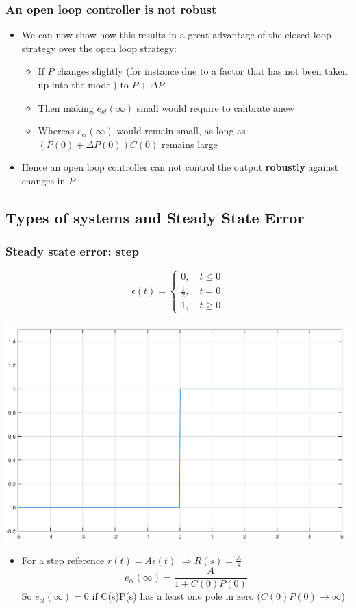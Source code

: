 \begin{frame}
	\frametitle{An open loop controller is not robust}
	\begin{itemize}
		\item We can now show how this results in a great advantage of the closed loop strategy over the open loop strategy:
		\begin{itemize}
			\item If $P$ changes slightly (for instance due to a factor that has not been taken up into the model) to $P+\Delta P$
			\item Then making $e_{ol}(\infty)$ small would require to calibrate anew
			\item Whereas $e_{cl} (\infty)$ would remain small, as long as $(P(0)+\Delta P(0))C(0)$ remains large
			
		\end{itemize}
		\item Hence an open loop controller can not control the output \textbf{robustly} against changes in $P$
	\end{itemize}
\end{frame}

\subsection[Types of systems and SS-error]{Types of systems and Steady State Error}

\begin{frame}
	\frametitle{Steady state error: step}
	\begin{definition}
		\begin{minipage}{0.4\linewidth}
			\[
			\epsilon (t) =
			\begin{cases}
			0, \quad t \leq 0 \\
			\frac{1}{2}, \quad t = 0 \\
			1, \quad t \geqslant 0
			\end{cases}
			\]
		\end{minipage}
		\begin{minipage}{0.5\linewidth}
			\hspace*{4em}
			\includegraphics[width=0.6\linewidth]{stepfunc}
		\end{minipage}
	\end{definition}
	\begin{itemize}
		\item For a step reference $r(t) = A \epsilon (t)$ $\Rightarrow R(s) = \frac{A}{s}$
		\[e_{cl}(\infty) = \frac{A}{1+C(0)P(0)} \]
		So $e_{cl}(\infty) = 0$ if C(s)P(s) has a least one pole in zero ($C(0)P(0) \rightarrow \infty$)
	\end{itemize}
\end{frame}

